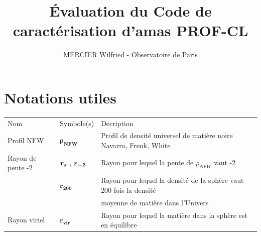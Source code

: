 \documentclass[a4paper,11pt]{article}
\numberwithin{equation}{section}
\begin{document}
\title{\LARGE \bf Évaluation du Code de caractérisation d'amas PROF-CL}
\author{MERCIER Wilfried - Observatoire de Paris}
\maketitle

\newpage

\section{Notations utiles}

\begin{tabular}{l l l}
  Nom & Symbole(s) & Decription \\
  Profil NFW & $\bm{\rho_{NFW}}$ & Profil de densité universel de matière noire Navarro, Frenk, White \\
  Rayon de pente -2 &  $\bm{r_s$} , \bm{$r_{-2}}$ & Rayon pour lequel la pente de $\rho_{NFW}$ vaut -2 \\
  & $\bm{r_{200}}$ & Rayon pour lequel la densité de la sphère vaut 200 fois la densité \\
  & & moyenne de matière dans l'Univers \\
  Rayon viriel & $\bm{r_{vir}}$ & Rayon pour lequel la matière dans la sphère est en équilibre
\end{tabular}

\newpage
\end{document}
